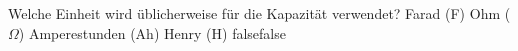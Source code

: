     {Welche Einheit wird üblicherweise für die Kapazität verwendet?}
    {Farad (F)}
    {Ohm ($\Omega$)}
    {Amperestunden (Ah)}
    {Henry (H)}
    {false}{false}